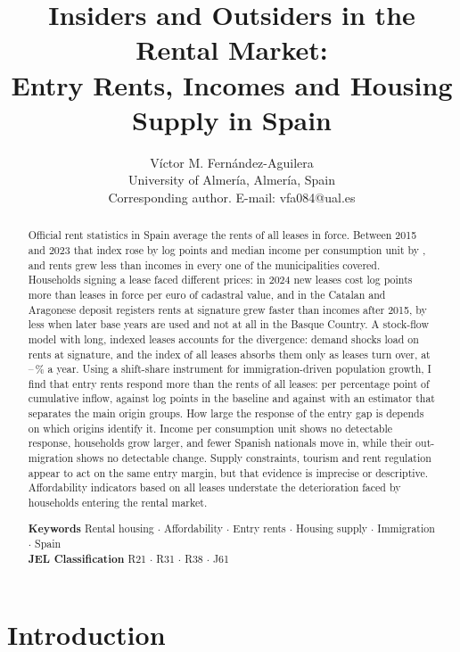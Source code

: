 \documentclass[11pt,a4paper]{article}
\title{\bfseries Insiders and Outsiders in the Rental Market:\\ Entry Rents, Incomes and Housing Supply in Spain}
\author{Víctor M. Fernández-Aguilera\\[4pt]
{\small University of Almería, Almería, Spain}\\
{\small Corresponding author. E-mail: vfa084@ual.es}}
\date{}
\begin{document}
\maketitle

\begin{abstract}\noindent
Official rent statistics in Spain average the rents of all leases in force. Between 2015 and 2023 that index rose by \insR{} log points and median income per consumption unit by \insY, and rents grew less than incomes in every one of the \insN{} municipalities covered. Households signing a lease faced different prices: in 2024 new leases cost \gapVr{} log points more than leases in force per euro of cadastral value, and in the Catalan and Aragonese deposit registers rents at signature grew faster than incomes after 2015, by less when later base years are used and not at all in the Basque Country. A stock-flow model with long, indexed leases accounts for the divergence: demand shocks load on rents at signature, and the index of all leases absorbs them only as leases turn over, at \mcAoneLo--\mcAoneHi\,\% a year. Using a shift-share instrument for immigration-driven population growth, I find that entry rents respond more than the rents of all leases: per percentage point of cumulative inflow, \bEntry{} against \bStock{} log points in the baseline and \gmmEntry{} against \gmmStock{} with an estimator that separates the main origin groups. How large the response of the entry gap is depends on which origins identify it. Income per consumption unit shows no detectable response, households grow larger, and fewer Spanish nationals move in, while their out-migration shows no detectable change. Supply constraints, tourism and rent regulation appear to act on the same entry margin, but that evidence is imprecise or descriptive. Affordability indicators based on all leases understate the deterioration faced by households entering the rental market.

\medskip\noindent\textbf{Keywords} Rental housing $\cdot$ Affordability $\cdot$ Entry rents $\cdot$ Housing supply $\cdot$ Immigration $\cdot$ Spain\\
\textbf{JEL Classification} R21 $\cdot$ R31 $\cdot$ R38 $\cdot$ J61
\end{abstract}
\clearpage
\linenumbers

\section{Introduction}\label{sec:intro}
\end{document}
